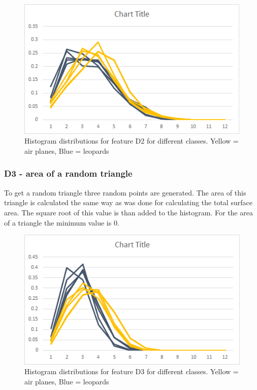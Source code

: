 \documentclass{bigdata}
\begin{document}
\begin{figure}[h!]
    \includegraphics[width=\linewidth]{Pictures/Part3/D2.png}
    \caption{Histogram distributions for feature D2 for different classes. Yellow = air planes, Blue = leopards}
  \label{fig:eccentricity}
\end{figure}

\subsubsection{D3 - area of a random triangle}
To get a random triangle three random points are generated. The area of this triangle is calculated the same way as was done for calculating the total surface area. The square root of this value is than added to the histogram. 
For the area of a triangle the minimum value is 0.

\begin{figure}[h!]
    \includegraphics[width=\linewidth]{Pictures/Part3/D3.png}
    \caption{Histogram distributions for feature D3 for different classes. Yellow = air planes, Blue = leopards}
  \label{fig:eccentricity}
\end{figure}
\end{document}
